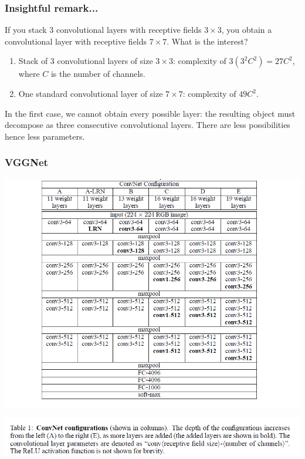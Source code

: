 \begin{frame}
	\frametitle{Insightful remark...}

	\justifying

	If you stack 3 convolutional layers with receptive fields $3 \times 3$, you obtain a convolutional layer with receptive fields $7\times 7$. What is the interest?

	\bigskip

	\begin{enumerate}
		\item Stack of $3$ convolutional layers of size $3 \times 3$: complexity of $3(3^2C^2) =27C^2$, where $C$ is the number of channels.

		\medskip

		\item One standard convolutional layer of size $7 \times 7$: complexity of $49C^2$.
	\end{enumerate}

	\bigskip

	In the first case, we cannot obtain every possible layer: the resulting object must  decompose as three consecutive convolutional layers. There are less possibilities hence less parameters.



\end{frame}



\begin{frame}
	\frametitle{VGGNet}

	\begin{center}
		\includegraphics[scale=0.7]{figs/VGGNet_structure}
	\end{center}

	\begin{center}
		\includegraphics[scale=0.7]{figs/VGGNet_caption}
	\end{center}
\end{frame}






